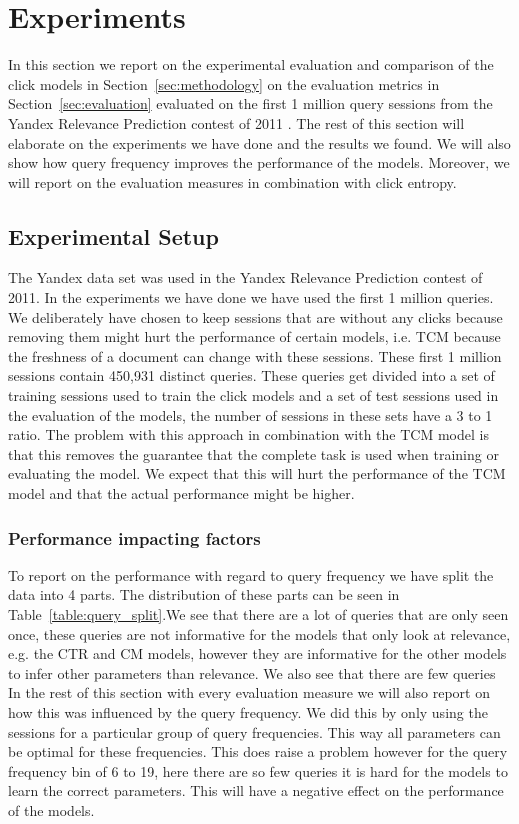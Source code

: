 \section{Experiments}
\label{sec:experiments}
In this section we report on the experimental evaluation and comparison of the click models in Section~\ref{sec:methodology} on the evaluation metrics in Section~\ref{sec:evaluation} evaluated on the first 1 million query sessions from the Yandex Relevance Prediction contest of 2011 \cite{YandexData}. The rest of this section will elaborate on the experiments we have done and the results we found. We will also show how query frequency improves the performance of the models. Moreover, we will report on the evaluation measures in combination with click entropy.

\subsection{Experimental Setup}
The Yandex data set was used in the Yandex Relevance Prediction contest of 2011. In the experiments we have done we have used the first 1 million queries. We deliberately have chosen to keep sessions that are without any clicks because removing them might hurt the performance of certain models, i.e. TCM because the freshness of a document can change with these sessions. These first 1 million sessions contain 450,931 distinct queries. These queries get divided into a set of training sessions used to train the click models and a set of test sessions used in the evaluation of the models, the number of sessions in these sets have a 3 to 1 ratio. The problem with this approach in combination with the TCM model is that this removes the guarantee that the complete task is used when training or evaluating the model. We expect that this will hurt the performance of the TCM model and that the actual performance might be higher. 

\subsubsection{Performance impacting factors}
To report on the performance with regard to query frequency we have split the data into 4 parts. The distribution of these parts can be seen in Table~\ref{table:query_split}.We see that there are a lot of queries that are only seen once, these queries are not informative for the models that only look at relevance, e.g. the CTR and CM models, however they are informative for the other models to infer other parameters than relevance. We also see that there are few queries In the rest of this section with every evaluation measure we will also report on how this was influenced by the query frequency. We did this by only using the sessions for a particular group of query frequencies. This way all parameters can be optimal for these frequencies. This does raise a problem however for the query frequency bin of 6 to 19, here there are so few queries it is hard for the models to learn the correct parameters. This will have a negative effect on the performance of the models. 

